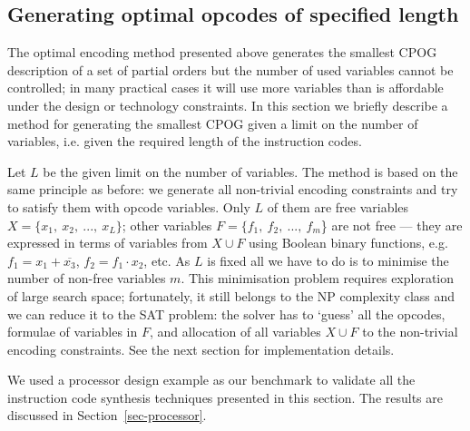 \subsection{Generating optimal opcodes of specified length\label{Sec:Generating-optimal-opcodes}}

The optimal encoding method presented above generates the smallest
CPOG description of a set of partial orders but the number of used
variables cannot be controlled; in many practical cases it will use
more variables than is affordable under the design or technology constraints.
In this section we briefly describe a method for generating the smallest
CPOG given a limit on the number of variables, i.e. given the required
length of the instruction codes.

Let $L$ be the given limit on the number of variables. The method
is based on the same principle as before: we generate all non-trivial
encoding constraints and try to satisfy them with opcode variables.
Only $L$ of them are free variables $X=\{x_{1},\ x_{2},\ ...,\ x_{L}\}$;
other variables $F=\{f_{1},\ f_{2},\ ...,\ f_{m}$\} are not free
--- they are expressed in terms of variables from $X\cup F$ using
Boolean binary functions, e.g. $f_{1}=x_{1}+\overline{x_{3}}$, $f_{2}=f_{1}\cdot x_{2}$,
etc. As $L$ is fixed all we have to do is to minimise the number
of non-free variables $m$. This minimisation problem requires exploration
of large search space; fortunately, it still belongs to the NP complexity
class and we can reduce it to the SAT problem: the solver has to `guess'
all the opcodes, formulae of variables in $F$, and allocation of
all variables $X\cup F$ to the non-trivial encoding constraints.
See the next section for implementation details.

We used a processor design example as our benchmark to validate all
the instruction code synthesis techniques presented in this section.
The results are discussed in Section~\ref{sec-processor}.


